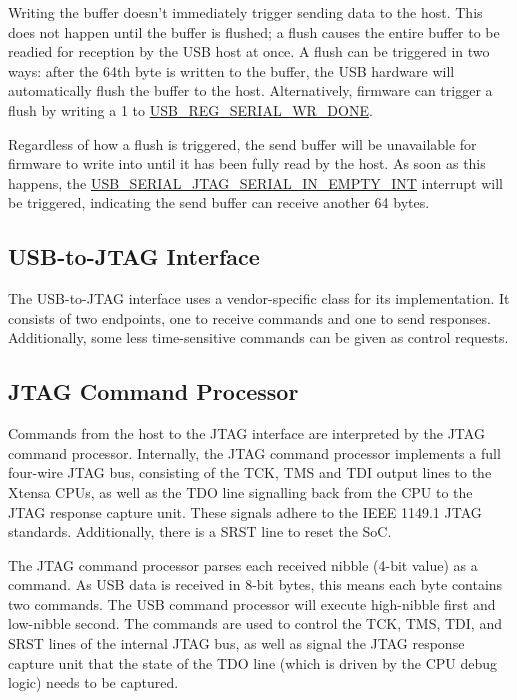 \documentclass[main\_\_EN.tex]{subfiles}
\begin{document}
Writing the buffer doesn't immediately trigger sending data to the host. This does not happen until the buffer is flushed; a flush causes the entire buffer to be readied for reception by the USB host at once. A flush can be triggered in two ways: after the 64th byte is written to the buffer, the USB hardware will automatically flush the buffer to the host. Alternatively, firmware can trigger a flush by writing a 1 to \hyperref[fielddesc:USBSERIALJTAGWRDONE]{USB\_REG\_SERIAL\_WR\_DONE}.

Regardless of how a flush is triggered, the send buffer will be unavailable for firmware to write into until it has been fully read by the host. As soon as this happens, the \hyperref[fielddesc:USBSERIALJTAGSERIALINEMPTYINTRAW]{USB\_SERIAL\_JTAG\_SERIAL\_IN\_EMPTY\_INT} interrupt will be triggered, indicating the send buffer can receive another 64 bytes.

\subsection{USB-to-JTAG Interface}

The USB-to-JTAG interface uses a vendor-specific class for its implementation. It consists of two endpoints, one to receive commands and one to send responses. Additionally, some less time-sensitive commands can be given as control requests.

\subsection{JTAG Command Processor}

Commands from the host to the JTAG interface are interpreted by the JTAG command processor. Internally, the JTAG command processor implements a full four-wire JTAG bus, consisting of the TCK, TMS and TDI output lines to the Xtensa CPUs, as well as the TDO line signalling back from the CPU to the JTAG response capture unit. These signals adhere to the IEEE 1149.1 JTAG standards. Additionally, there is a SRST line to reset the SoC.

The JTAG command processor parses each received nibble (4-bit value) as a command. As USB data is received in 8-bit bytes, this means each byte contains two commands. The USB command processor will execute high-nibble first and low-nibble second. The commands are used to control the TCK, TMS, TDI, and SRST lines of the internal JTAG bus, as well as signal the JTAG response capture unit that the state of the TDO line (which is driven by the CPU debug logic) needs to be captured.
\end{document}
